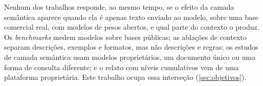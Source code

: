 Nenhum dos trabalhos responde, ao mesmo tempo, se o efeito da camada
semântica aparece quando ela é apenas texto enviado ao modelo, sobre uma
base comercial real, com modelos de pesos abertos, e qual parte do
contexto o produz. Os \textit{benchmarks} medem modelos sobre bases
públicas; as ablações de contexto separam descrições, exemplos e formatos,
mas não descrições e regras; os estudos de camada semântica usam modelos
proprietários, um documento único ou uma forma de consulta diferente; e o
relato com níveis cumulativos vem de uma plataforma proprietária. Este
trabalho ocupa essa interseção (\autoref{sec:objetivos}).
